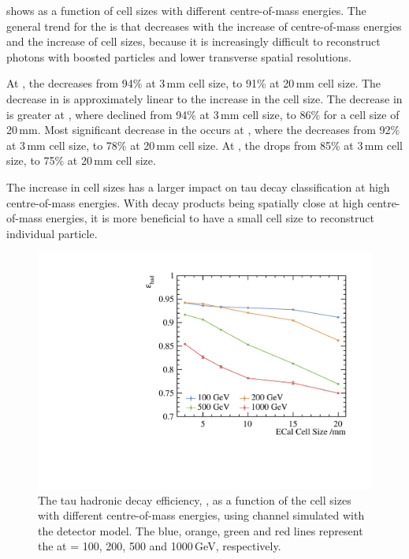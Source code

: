  shows \tauHad as a function of \ECAL cell sizes with different centre-of-mass energies. The general trend for the \tauHad is that \tauHad decreases with the increase of centre-of-mass energies and the increase of \ECAL cell sizes, because it is increasingly difficult to reconstruct photons with boosted particles and lower \ECAL transverse spatial resolutions.


At , the \tauHad decreases from 94\% at 3\,mm cell size, to 91\% at 20\,mm cell size. The decrease in \tauHad is approximately linear to the increase in the cell size. The decrease in \tauHad is greater at , where \tauHad declined from 94\% at 3\,mm cell size, to 86\% for a \ECAL cell size of  20\,mm. Most significant decrease in the \tauHad occurs at  , where the \tauHad decreases from 92\% at 3\,mm cell size, to 78\% at 20\,mm cell size. At , the \tauHad drops from 85\% at 3\,mm cell size, to 75\% at 20\,mm cell size.


The increase in \ECAL cell sizes has a larger impact on tau decay classification at high centre-of-mass energies. With decay products being spatially close at high centre-of-mass energies, it is more beneficial to have a small \ECAL cell size to reconstruct individual particle.

\begin{figure}[htbp]
\centering %
\includegraphics[width=.85\textwidth]{tau/plots3/hadronicEff.pdf}
\caption[The tau hadronic decay efficiency as a function of  the \ECAL cell sizes at different \sqrtS with the \ILD detector model.]
{The tau hadronic decay efficiency, \tauHad, as a function of  the \ECAL cell sizes with different centre-of-mass energies, using \eeTauTau channel simulated with the \ILD detector model. The blue, orange, green and red lines  represent the \tauHad at \sqrtS = 100, 200, 500 and 1000\,GeV, respectively.}
\label{fig:TauHadronicEfficiency}
\end{figure}


